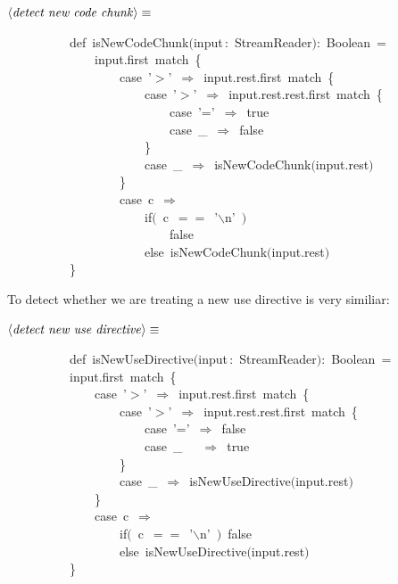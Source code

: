 \documentclass[a4paper,12pt]{article}
\begin{document}
$\left<\mbox{\emph{detect new code chunk}}\right>\equiv$
\begin{program}~~~~~~~~~~{\vem def}~isNewCodeChunk$($input\,{\rm :}~StreamReader$)${\rm :}~Boolean~=
\\~~~~~~~~~~~~~~input.first~{\vem match}~{\small\{}
\\~~~~~~~~~~~~~~~~~~{\vem case}~'$>$'~$\Rightarrow$~input.rest.first~{\vem match}~{\small\{}
\\~~~~~~~~~~~~~~~~~~~~~~{\vem case}~'$>$'~$\Rightarrow$~input.rest.rest.first~{\vem match}~{\small\{}
\\~~~~~~~~~~~~~~~~~~~~~~~~~~{\vem case}~'='~$\Rightarrow$~{\vem true}
\\~~~~~~~~~~~~~~~~~~~~~~~~~~{\vem case}~\_~$\Rightarrow$~{\vem false}
\\~~~~~~~~~~~~~~~~~~~~~~{\small\}}
\\~~~~~~~~~~~~~~~~~~~~~~{\vem case}~\_~$\Rightarrow$~isNewCodeChunk$($input.rest$)$
\\~~~~~~~~~~~~~~~~~~{\small\}}
\\~~~~~~~~~~~~~~~~~~{\vem case}~c~$\Rightarrow$
\\~~~~~~~~~~~~~~~~~~~~~~{\vem if}$($~c~$==$~'$\backslash$n'~$)$
\\~~~~~~~~~~~~~~~~~~~~~~~~~~{\vem false}
\\~~~~~~~~~~~~~~~~~~~~~~{\vem else}~isNewCodeChunk$($input.rest$)$
\\~~~~~~~~~~{\small\}}
\\[0.5em]\end{program}


To detect whether we are treating a new use directive is very similiar:

$\left<\mbox{\emph{detect new use directive}}\right>\equiv$
\begin{program}~~~~~~~~~~{\vem def}~isNewUseDirective$($input\,{\rm :}~StreamReader$)${\rm :}~Boolean~=
\\~~~~~~~~~~input.first~{\vem match}~{\small\{}
\\~~~~~~~~~~~~~~{\vem case}~'$>$'~$\Rightarrow$~input.rest.first~{\vem match}~{\small\{}
\\~~~~~~~~~~~~~~~~~~{\vem case}~'$>$'~$\Rightarrow$~input.rest.rest.first~{\vem match}~{\small\{}
\\~~~~~~~~~~~~~~~~~~~~~~{\vem case}~'='~$\Rightarrow$~{\vem false}
\\~~~~~~~~~~~~~~~~~~~~~~{\vem case}~\_~~~$\Rightarrow$~{\vem true}
\\~~~~~~~~~~~~~~~~~~{\small\}}
\\~~~~~~~~~~~~~~~~~~{\vem case}~\_~$\Rightarrow$~isNewUseDirective$($input.rest$)$
\\~~~~~~~~~~~~~~{\small\}}
\\~~~~~~~~~~~~~~{\vem case}~c~$\Rightarrow$
\\~~~~~~~~~~~~~~~~~~{\vem if}$($~c~$==$~'$\backslash$n'~$)$~{\vem false}
\\~~~~~~~~~~~~~~~~~~{\vem else}~isNewUseDirective$($input.rest$)$
\\~~~~~~~~~~{\small\}}
\\[0.5em]\end{program}
\end{document}
